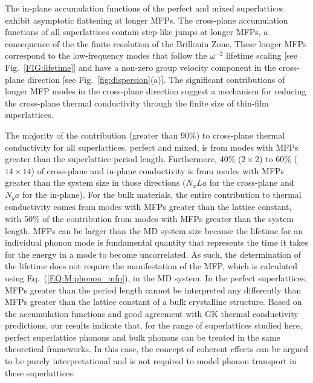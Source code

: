 \documentclass[aps,prb,preprint,preprintnumbers,amsmath,amssymb,floatfix,superscriptaddress]{revtex4}
\begin{document}
The in-plane accumulation functions of the perfect and mixed superlattices exhibit asymptotic flattening at longer MFPs. The cross-plane accumulation functions of all superlattices contain step-like jumps at longer MFPs, a consequence of the the finite resolution of the Brillouin Zone.\cite{esfarjani2011heat} These longer MFPs correspond to the low-frequency modes that follow the $\omega^{-2}$ lifetime scaling [see Fig.~\ref{FIG:lifetime}] and have a non-zero group velocity component in the cross-plane direction [see Fig.~\ref{fig:dispersion}(a)]. The significant contributions of longer MFP modes in the cross-plane direction suggest a mechanism for reducing the cross-plane thermal conductivity through the finite size of thin-film superlattices.\cite{Luckyanova16112012} 

The majority of the contribution (greater than 90\%) to cross-plane thermal conductivity for all superlattices, perfect and mixed, is from modes with MFPs greater than the superlattice period length. Furthermore, 40\% ($2 \times 2 $) to 60\% ($14 \times 14$) of cross-plane and in-plane conductivity is from modes with MFPs greater than the system size in those directions ($N_xLa$ for the cross-plane and $N_ya$ for the in-plane). For the bulk materials, the entire contribution to thermal conductivity comes from modes with MFPs greater than the lattice constant, with 50\% of the contribution from modes with MFPs greater than the system length. {\color{red} MFPs can be larger than the MD system size because the lifetime for an individual phonon mode is fundamental quantity that represents the time it takes for the energy in a mode to become uncorrelated. \cite{PhysRevB.71.184305} As such, the determination of the lifetime does not require the manifestation of the MFP, which is calculated using Eq.~(\ref{EQ:M:phonon_mfp}), in the MD system.} In the perfect superlattices, MFPs greater than the period length cannot be interpreted any differently than MFPs greater than the lattice constant of a bulk crystalline structure. Based on the accumulation functions and good agreement with GK thermal conductivity predictions, our results indicate that, for the range of superlattices studied here, perfect superlattice phonons and bulk phonons can be treated in the same theoretical frameworks. In this case, the concept of coherent effects can be argued to be purely interpretational and is not required to model phonon transport in these superlattices. 
\end{document}
